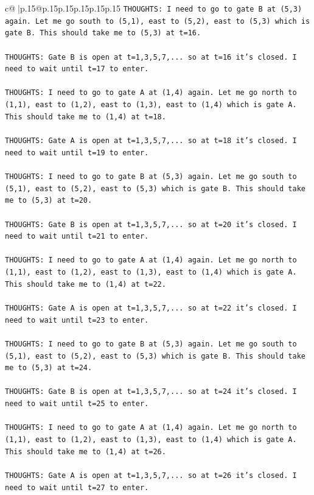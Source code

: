 \documentclass{article}
\begin{document}
{\begin{supertabular}{c@{$\;$}|p{.15\linewidth}@{}p{.15\linewidth}p{.15\linewidth}p{.15\linewidth}p{.15\linewidth}p{.15\linewidth}}
{{{\texttt{THOUGHTS: I need to go to gate B at (5,3) again. Let me go south to (5,1), east to (5,2), east to (5,3) which is gate B. This should take me to (5,3) at t=16.} \\
\\ 
\texttt{THOUGHTS: Gate B is open at t=1,3,5,7,... so at t=16 it's closed. I need to wait until t=17 to enter.} \\
\\ 
\texttt{THOUGHTS: I need to go to gate A at (1,4) again. Let me go north to (1,1), east to (1,2), east to (1,3), east to (1,4) which is gate A. This should take me to (1,4) at t=18.} \\
\\ 
\texttt{THOUGHTS: Gate A is open at t=1,3,5,7,... so at t=18 it's closed. I need to wait until t=19 to enter.} \\
\\ 
\texttt{THOUGHTS: I need to go to gate B at (5,3) again. Let me go south to (5,1), east to (5,2), east to (5,3) which is gate B. This should take me to (5,3) at t=20.} \\
\\ 
\texttt{THOUGHTS: Gate B is open at t=1,3,5,7,... so at t=20 it's closed. I need to wait until t=21 to enter.} \\
\\ 
\texttt{THOUGHTS: I need to go to gate A at (1,4) again. Let me go north to (1,1), east to (1,2), east to (1,3), east to (1,4) which is gate A. This should take me to (1,4) at t=22.} \\
\\ 
\texttt{THOUGHTS: Gate A is open at t=1,3,5,7,... so at t=22 it's closed. I need to wait until t=23 to enter.} \\
\\ 
\texttt{THOUGHTS: I need to go to gate B at (5,3) again. Let me go south to (5,1), east to (5,2), east to (5,3) which is gate B. This should take me to (5,3) at t=24.} \\
\\ 
\texttt{THOUGHTS: Gate B is open at t=1,3,5,7,... so at t=24 it's closed. I need to wait until t=25 to enter.} \\
\\ 
\texttt{THOUGHTS: I need to go to gate A at (1,4) again. Let me go north to (1,1), east to (1,2), east to (1,3), east to (1,4) which is gate A. This should take me to (1,4) at t=26.} \\
\\ 
\texttt{THOUGHTS: Gate A is open at t=1,3,5,7,... so at t=26 it's closed. I need to wait until t=27 to enter.} \\
}}}
\end{supertabular}}
\end{document}
